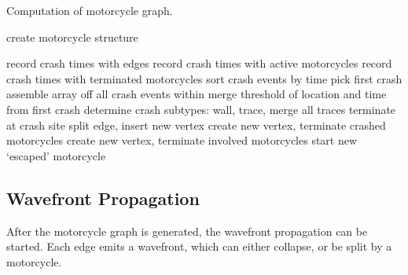 \documentclass[12pt,a4paper,oneside,openany]{article}
\begin{document}
\begin{algorithm}
\caption{Computation of motorcycle graph.}
\label{alg:mc}
\begin{algorithmic}
	\State create motorcycle structure
\EndFor

\Repeat
		\State record crash times with edges
		\State record crash times with active motorcycles
		\State record crash times with terminated motorcycles
	\EndFor
	\State sort crash events by time
	\State pick first crash
	\State assemble array off all crash events within merge threshold of location and time from first crash
	\State determine crash subtypes: wall, trace, merge
		\State all traces terminate at crash site
			\State split edge, insert new vertex
		\EndIf
		\State create new vertex, terminate crashed motorcycles
	\Else
		\State create new vertex, terminate involved motorcycles
			\State start new `escaped' motorcycle
		\EndIf
	\EndIf 

\end{algorithmic}
\end{algorithm}

\subsection{Wavefront Propagation}

After the motorcycle graph is generated, the wavefront propagation can be started. Each edge emits a wavefront, which can either collapse, or be split by a motorcycle.
\end{document}
